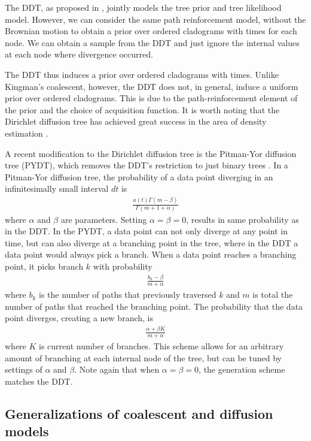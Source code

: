 \documentclass{article}
\begin{document}
The DDT, as proposed in \citep{Neal2003}, 
jointly models the tree prior and tree likelihood model.
However, we can consider the same
path reinforcement model, without the Brownian motion
to obtain a prior over ordered cladograms
with times for each node.
We can obtain a sample from the DDT and just ignore the
internal values at each node where divergence occurred.

The DDT thus induces a prior over ordered cladograms
with times.
Unlike Kingman's coalescent, however, the DDT
does not, in general, induce a uniform prior over ordered cladograms.
This is due to the path-reinforcement element
of the prior and the choice of acquisition function.
It is worth noting that the Dirichlet diffusion tree has achieved
great success in the area of density estimation \citep{Adams2008}.

A recent modification to the Dirichlet diffusion tree
is the Pitman-Yor diffusion tree (PYDT),
which removes the DDT's restriction to just binary trees
\citep{Knowles2015}.
In a Pitman-Yor diffusion tree, the probability
of a data point diverging in an infinitesimally small
interval $dt$ is
\begin{align}
  \frac{a(t)\Gamma(m - \beta)}{\Gamma(m + 1 + \alpha)}
\end{align}
where $\alpha$ and $\beta$ are parameters. Setting $\alpha = \beta = 0$,
results in same probability as in the DDT.
In the PYDT, a data point can not only
diverge at any point in time,
but can also diverge at a branching point
in the tree, where in the DDT
a data point would always pick a branch.
When a data point reaches a branching point,
it picks branch $k$
with probability
\begin{align}
  \frac{b_k - \beta}{m + \alpha}
\end{align}
where $b_k$ is the number of paths
that previously traversed $k$
and $m$ is total the number of paths
that reached the branching point.
The probability that the data point
diverges, creating a new branch, is
\begin{align}
  \frac{\alpha + \beta K}{m + \alpha}
\end{align}
where $K$ is current number of branches.
This scheme allows for an arbitrary amount of
branching at each internal node of the tree,
but can be tuned by settings of $\alpha$ and $\beta$.
Note again that when $\alpha = \beta = 0$,
the generation scheme matches the DDT.

\subsection{Generalizations of coalescent and diffusion models}
\end{document}
